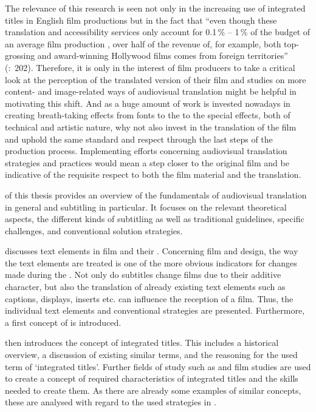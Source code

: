 \largerpage
The relevance of this research is seen not only in the increasing use of integrated titles in English film productions but in the fact that “even though these translation and accessibility services only account for 0.1\,\% – 1\,\% of the budget of an average film production \citep{Lambourne2012}, over half of the revenue of, for example, both top-grossing and award-winning Hollywood films comes from foreign territories” (\citealt{romero-fresco2013}:~202). Therefore, it is only in the interest of film producers to take a critical look at the perception of the translated version of their film and studies on more content- and image-related ways of audiovisual translation might be helpful in motivating this shift. And as a huge amount of work is invested nowadays in creating breath-taking effects from fonts to the  to the special effects, both of technical and artistic nature, why not also invest in the translation of the film and uphold the same standard and respect through the last steps of the production process. Implementing efforts concerning audiovisual translation strategies and practices would mean a step closer to the original film and be indicative of the requisite respect to both the film material and the translation.

 of this thesis provides an overview of the fundamentals of audiovisual translation in general and subtitling in particular. It focuses on the relevant theoretical aspects, the different kinds of subtitling as well as traditional guidelines, specific challenges, and conventional solution strategies.

 discusses text elements in film and their . Concerning film  and design, the way the text elements are treated is one of the more obvious indicators for changes made during the . Not only do subtitles change films due to their additive character, but also the translation of already existing text elements such as captions, displays, inserts etc. can influence the reception of a film. Thus, the individual text elements and conventional  strategies are presented. Furthermore, a first concept of  is introduced.

 then introduces the concept of integrated titles. This includes a historical overview, a discussion of existing similar terms, and the reasoning for the used term of ‘integrated titles’. Further fields of study such as  and film studies are used to create a concept of required characteristics of integrated titles and the skills needed to create them. As there are already some examples of similar concepts, these are analysed with regard to the used  strategies in .

